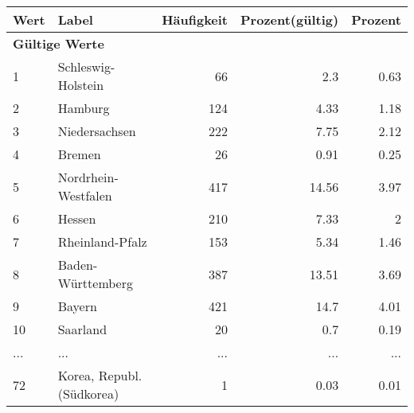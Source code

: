      \begin{longtable}{lXrrr}
     \toprule
     \textbf{Wert} & \textbf{Label} & \textbf{Häufigkeit} & \textbf{Prozent(gültig)} & \textbf{Prozent} \\
     \endhead
     \midrule
     \multicolumn{5}{l}{\textbf{Gültige Werte}}\\
        1 & \multicolumn{1}{X}{Schleswig-Holstein} & %
          \num{66} &
          \num[round-mode=places,round-precision=2]{2,3} &
          \num[round-mode=places,round-precision=2]{0,63} \\
        2 & \multicolumn{1}{X}{Hamburg} & %
          \num{124} &
          \num[round-mode=places,round-precision=2]{4,33} &
          \num[round-mode=places,round-precision=2]{1,18} \\
        3 & \multicolumn{1}{X}{Niedersachsen} & %
          \num{222} &
          \num[round-mode=places,round-precision=2]{7,75} &
          \num[round-mode=places,round-precision=2]{2,12} \\
        4 & \multicolumn{1}{X}{Bremen} & %
          \num{26} &
          \num[round-mode=places,round-precision=2]{0,91} &
          \num[round-mode=places,round-precision=2]{0,25} \\
        5 & \multicolumn{1}{X}{Nordrhein-Westfalen} & %
          \num{417} &
          \num[round-mode=places,round-precision=2]{14,56} &
          \num[round-mode=places,round-precision=2]{3,97} \\
        6 & \multicolumn{1}{X}{Hessen} & %
          \num{210} &
          \num[round-mode=places,round-precision=2]{7,33} &
          \num[round-mode=places,round-precision=2]{2} \\
        7 & \multicolumn{1}{X}{Rheinland-Pfalz} & %
          \num{153} &
          \num[round-mode=places,round-precision=2]{5,34} &
          \num[round-mode=places,round-precision=2]{1,46} \\
        8 & \multicolumn{1}{X}{Baden-Württemberg} & %
          \num{387} &
          \num[round-mode=places,round-precision=2]{13,51} &
          \num[round-mode=places,round-precision=2]{3,69} \\
        9 & \multicolumn{1}{X}{Bayern} & %
          \num{421} &
          \num[round-mode=places,round-precision=2]{14,7} &
          \num[round-mode=places,round-precision=2]{4,01} \\
        10 & \multicolumn{1}{X}{Saarland} & %
          \num{20} &
          \num[round-mode=places,round-precision=2]{0,7} &
          \num[round-mode=places,round-precision=2]{0,19} \\
       ... & ... & ... & ... & ... \\
        72 & \multicolumn{1}{X}{Korea, Republ. (Südkorea)} & %
          \num{1} &
          \num[round-mode=places,round-precision=2]{0,03} &
          \num[round-mode=places,round-precision=2]{0,01} \\


\end{longtable}

